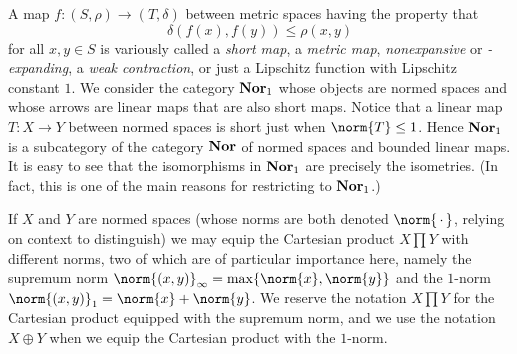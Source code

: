 \documentclass[article, a4paper, 11pt, oneside]{memoir}
\numberwithin{equation}{chapter}
\theoremstyle{nonumberplain}
\begin{document}
\begin{remarkbreak}
	A map $f \colon (S,\rho) \to (T,\delta)$ between metric spaces having the property that
	\begin{equation*}
		\delta(f(x), f(y))
			\leq \rho(x, y)
	\end{equation*}
	for all $x,y \in S$ is variously called a \emph{short map}, a \emph{metric map}, \emph{nonexpansive} or \emph{-expanding}, a \emph{weak contraction}, or just a Lipschitz function with Lipschitz constant $1$. We consider the category $\mathbf{Nor}_1$ whose objects are normed spaces and whose arrows are linear maps that are also short maps. Notice that a linear map $T \colon X \to Y$ between normed spaces is short just when $\norm{T} \leq 1$. Hence $\mathbf{Nor}_1$ is a subcategory of the category $\mathbf{Nor}$ of normed spaces and bounded linear maps. It is easy to see that the isomorphisms in $\mathbf{Nor}_1$ are precisely the isometries. (In fact, this is one of the main reasons for restricting to $\mathbf{Nor}_1$.)

	If $X$ and $Y$ are normed spaces (whose norms are both denoted $\norm{\,\cdot\,}$, relying on context to distinguish) we may equip the Cartesian product $X \prod Y$ with different norms, two of which are of particular importance here, namely the supremum norm $\norm{(x,y)}_\infty = \max\{ \norm{x}, \norm{y} \}$ and the $1$-norm $\norm{(x,y)}_1 = \norm{x} + \norm{y}$. We reserve the notation $X \prod Y$ for the Cartesian product equipped with the supremum norm, and we use the notation $X \oplus Y$ when we equip the Cartesian product with the $1$-norm.


\end{remarkbreak}
\end{document}
